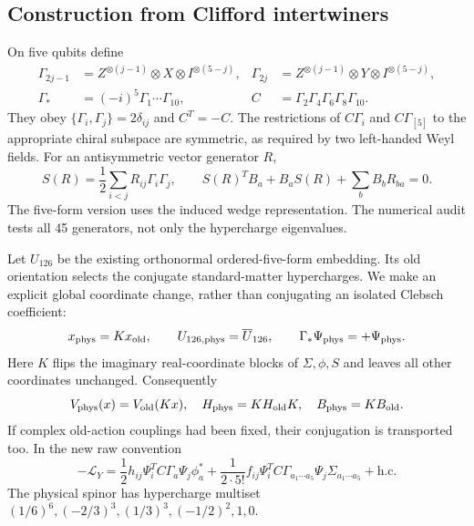 \documentclass[11pt]{article}
\begin{document}
\subsection{Construction from Clifford intertwiners}
On five qubits define
\begin{align}
 \Gamma_{2j-1}&=Z^{\otimes(j-1)}\otimes X\otimes I^{\otimes(5-j)},&
 \Gamma_{2j}&=Z^{\otimes(j-1)}\otimes Y\otimes I^{\otimes(5-j)},\\
 \Gamma_*&=(-i)^5\Gamma_1\cdots\Gamma_{10},&
 C&=\Gamma_2\Gamma_4\Gamma_6\Gamma_8\Gamma_{10}.
\end{align}
They obey $\{\Gamma_i,\Gamma_j\}=2\delta_{ij}$ and $C^T=-C$.
The restrictions of $C\Gamma_i$ and $C\Gamma_{[5]}$ to the appropriate
chiral subspace are symmetric, as required by two left-handed Weyl fields.
For an antisymmetric vector generator $R$,
\begin{equation}
 S(R)=\frac12\sum_{i<j}R_{ij}\Gamma_i\Gamma_j,
 \qquad S(R)^T B_a+B_a S(R)+\sum_bB_b R_{ba}=0.
\end{equation}
The five-form version uses the induced wedge representation. The numerical
audit tests all 45 generators, not only the hypercharge eigenvalues.

Let $U_{126}$ be the existing orthonormal ordered-five-form embedding.
Its old orientation selects the conjugate standard-matter hypercharges.
We make an explicit global coordinate change, rather than conjugating an
isolated Clebsch coefficient:
\begin{equation}
 x_{\rm phys}=Kx_{\rm old},\qquad U_{126,\rm phys}=\overline U_{126},
 \qquad \Gamma_*\Psi_{\rm phys}=+\Psi_{\rm phys}.
\end{equation}
Here $K$ flips the imaginary real-coordinate blocks of $\Sigma,\phi,S$ and
leaves all other coordinates unchanged. Consequently
\begin{equation}
 V_{\rm phys}(x)=V_{\rm old}(Kx),\quad H_{\rm phys}=KH_{\rm old}K,
 \quad B_{\rm phys}=KB_{\rm old}.
\end{equation}
If complex old-action couplings had been fixed, their conjugation is
transported too. In the new raw convention
\begin{equation}
 -\mathcal L_Y=\frac12h_{ij}\Psi_i^TC\Gamma_a\Psi_j\phi_a^*
 +\frac1{2\cdot5!}f_{ij}\Psi_i^TC\Gamma_{a_1\cdots a_5}\Psi_j
 \Sigma_{a_1\cdots a_5}+\mathrm{h.c.}
\end{equation}
The physical spinor has hypercharge multiset
$(1/6)^6,(-2/3)^3,(1/3)^3,(-1/2)^2,1,0$.
\end{document}
